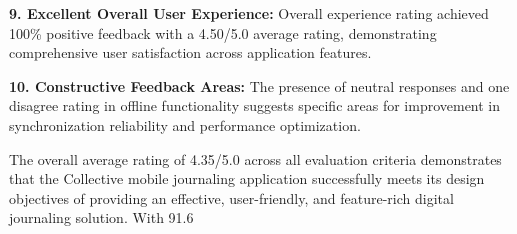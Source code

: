 \textbf{9. Excellent Overall User Experience:} Overall experience rating achieved 100\% positive feedback with a 4.50/5.0 average rating, demonstrating comprehensive user satisfaction across application features.

\textbf{10. Constructive Feedback Areas:} The presence of neutral responses and one disagree rating in offline functionality suggests specific areas for improvement in synchronization reliability and performance optimization.

The overall average rating of 4.35/5.0 across all evaluation criteria demonstrates that the Collective mobile journaling application successfully meets its design objectives of providing an effective, user-friendly, and feature-rich digital journaling solution. With 91.6%